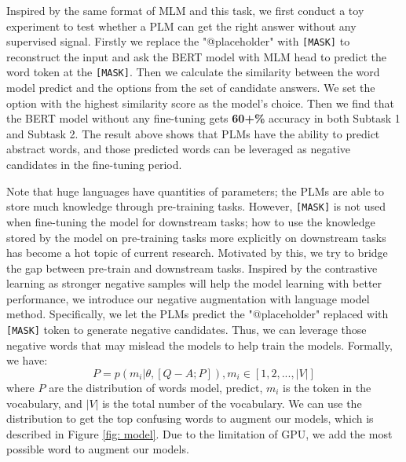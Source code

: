 \documentclass[11pt,a4paper]{article}
\begin{document}
Inspired by the same format of MLM and this task, we first conduct a toy experiment to test whether a PLM can get the right answer without any supervised signal.
Firstly we replace the "@placeholder" with \texttt{[MASK]} to reconstruct the input and ask the BERT model with MLM head to predict the word token at the \texttt{[MASK]}.
Then we calculate the similarity between the word model predict and the options from the set of candidate answers.
We set the option with the highest similarity score as the model's choice.
Then we find that the BERT model without any fine-tuning gets \textbf{60+\%} accuracy in both Subtask 1 and Subtask 2.
The result above shows that PLMs have the ability to predict abstract words, and those predicted words can be leveraged as negative candidates in the fine-tuning period.

Note that huge languages have quantities of parameters; the PLMs are able to store much knowledge through pre-training tasks. 
However, \texttt{[MASK]} is not used when fine-tuning the model for downstream tasks; how to use the knowledge stored by the model on pre-training tasks more explicitly on downstream tasks has become a hot topic of current research.
Motivated by this, we try to bridge the gap between pre-train and downstream tasks.
Inspired by the contrastive learning \cite{DBLP:conf/icml/ChenK0H20,DBLP:journals/corr/abs-2010-04592} as stronger negative samples will help the model learning with better performance, we introduce our negative augmentation with language model method.
Specifically,  we let the PLMs predict the "@placeholder" replaced with \texttt{[MASK]} token to generate negative candidates.
Thus, we can leverage those negative words that may mislead the models to help train the models. Formally, we have:
\begin{equation}
P = p(m_i| \theta ,[Q-A;P]), m_i \in [1,2,...,|V|]
\end{equation}
where $P$ are the distribution of words model, predict, $m_i$ is the token in the vocabulary, and $|V|$ is the total number of the vocabulary.
We can use the distribution to get the top confusing words to augment our models, which is described in Figure \ref{fig: model}.
Due to the limitation of GPU, we add the most possible word to augment our models.
\end{document}
